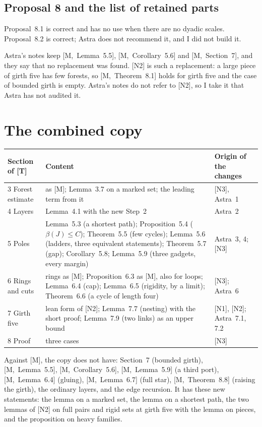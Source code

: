 \documentclass[11pt]{article}
\newcommand{\M}[1]{[M,~#1]}
\begin{document}
\subsection{Proposal 8 and the list of retained parts}

Proposal~8.1 is correct and has no use when there are no dyadic scales. Proposal~8.2 is correct;
Astra does not recommend it, and I did not build it.

Astra's notes keep \M{Lemma~5.5}, \M{Corollary~5.6} and \M{Section~7}, and they say that no
replacement was found. [N2] is such a replacement: a large piece of girth five has few forests,
so \M{Theorem~8.1} holds for girth five and the case of bounded girth is empty. Astra's notes do
not refer to [N2], so I take it that Astra has not audited it.

\section{The combined copy}\label{sec:copy}

\begin{center}\small
\begin{tabular}{@{}p{2.6cm}p{6.6cm}p{5.0cm}@{}}
\toprule
\textsf{\textbf{Section of [T]}} & \textsf{\textbf{Content}} & \textsf{\textbf{Origin of the changes}}\\
\midrule
3 Forest estimate & as [M]; Lemma~3.7 on a marked set; the leading term from it & [N3], Astra~1\\
4 Layers & Lemma~4.1 with the new Step~2 & Astra~2\\
5 Poles & Lemma~5.3 (a shortest path); Proposition~5.4 ($\beta(J)\le C$); Theorem~5.5 (few
cycles); Lemma~5.6 (ladders, three equivalent statements); Theorem~5.7 (gap); Corollary~5.8;
Lemma~5.9 (three gadgets, every margin) & Astra~3, 4; [N3]\\
6 Rings and cuts & rings as [M]; Proposition~6.3 as [M], also for loops; Lemma~6.4 (cap);
Lemma~6.5 (rigidity, by a limit); Theorem~6.6 (a cycle of length four) & [N3]; Astra~6\\
7 Girth five & lean form of [N2]; Lemma~7.7 (nesting) with the short proof; Lemma~7.9 (two
links) as an upper bound & [N1], [N2]; Astra~7.1, 7.2\\
8 Proof & three cases & [N3]\\
\bottomrule
\end{tabular}
\end{center}

\noindent Against [M], the copy does not have: Section~7 (bounded girth), \M{Lemma~5.5},
\M{Corollary~5.6}, \M{Lemma~5.9} (a third port), \M{Lemma~6.4} (gluing), \M{Lemma~6.7} (full
star), \M{Theorem~8.8} (raising the girth), the ordinary layers, and the edge recursion. It has
these new statements: the lemma on a marked set, the lemma on a shortest path, the two lemmas
of [N2] on full pairs and rigid sets at girth five with the lemma on pieces, and the proposition
on heavy families.
\end{document}
